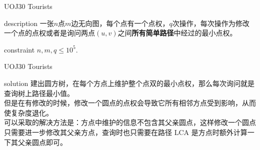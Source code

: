 \documentclass{beamer}
\def\le{\leqslant}
\begin{document}
\begin{frame}{UOJ30 Tourists}
	\begin{block}{description}
		一张$n$点$m$边无向图，每个点有一个点权，$q$次操作，每次操作为修改一个点的点权或者是询问两点$(u,v)$之间\textbf{所有简单路径}中经过的最小点权。
	\end{block}
	\begin{block}{constraint}
		$n, m, q \le 10^5.$
	\end{block}
\end{frame}
\begin{frame}{UOJ30 Tourists}
	\begin{block}{solution}
		建出圆方树，在每个方点上维护整个点双的最小点权，那么每次询问就是查询树上路径最小值。\\
		
		但是在有修改的时候，修改一个圆点的点权会导致它所有相邻方点受到影响，从而使复杂度退化。\\
		
		可以采取的解决方法是：方点中维护的信息不包含其父亲圆点，这样修改一个圆点只需要进一步修改其父亲方点，查询时也只需要在路径 LCA 是方点时额外计算一下其父亲圆点即可。
	\end{block}
\end{frame}
\end{document}

